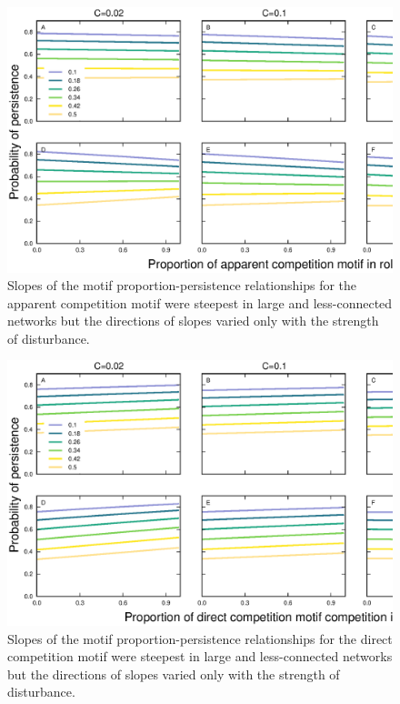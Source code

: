 \documentclass[12pt]{article}
\begin{document}
\begin{spacing}{2.0}
    \begin{figure}[hb!]
        \centering
        \includegraphics[width=\textwidth]{figures/persistence_apparent_detailpers.eps}
        \caption{Slopes of the motif proportion-persistence relationships for the apparent competition motif were steepest in large and less-connected networks but the directions of slopes varied only with the strength of disturbance.}
        \label{apparent_plus_SC}
        \end{figure}

    \begin{figure}[hb!]
        \centering
        \includegraphics[width=\textwidth]{figures/persistence_direct_detailpers.eps}
        \caption{Slopes of the motif proportion-persistence relationships for the direct competition motif were steepest in large and less-connected networks but the directions of slopes varied only with the strength of disturbance.}
        \label{direct_plus_SC}
        \end{figure}
    


\end{spacing}
\end{document}
